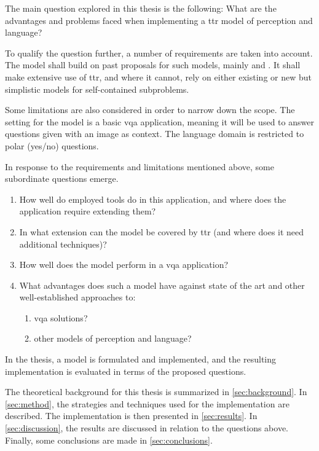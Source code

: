 The main question explored in this thesis is the following: What are the advantages and problems faced when implementing a \gls{ttr} model of perception and language?

To qualify the question further, a number of requirements are taken into account.
The model shall build on past proposals for such models, mainly \cite{ttrspat} and \cite{lspc}.
It shall make extensive use of \gls{ttr}, and where it cannot, rely on either existing or new but simplistic models for self-contained subproblems.

Some limitations are also considered in order to narrow down the scope.
The setting for the model is a basic \gls{vqa} application, meaning it will be used to answer questions given with an image as context.
The language domain is restricted to polar (yes/no) questions.


In response to the requirements and limitations mentioned above, some subordinate questions emerge.

\begin{enumerate}
\item How well do employed tools do in this application, and where does the application require extending them?
\item In what extension can the model be covered by \gls{ttr} (and where does it need additional techniques)?
\item How well does the model perform in a \gls{vqa} application?
\item What advantages does such a model have against state of the art and other well-established approaches to:
    \begin{enumerate}
    \item \gls{vqa} solutions?
    \item other models of perception and language?
    \end{enumerate}
\end{enumerate}

In the thesis, a model is formulated and implemented, and the resulting implementation is evaluated in terms of the proposed questions.


The theoretical background for this thesis is summarized in \autoref{sec:background}.
In \autoref{sec:method}, the strategies and techniques used for the implementation are described.
The implementation is then presented in \autoref{sec:results}.
In \autoref{sec:discussion}, the results are discussed in relation to the questions above.
Finally, some conclusions are made in \autoref{sec:conclusions}.
